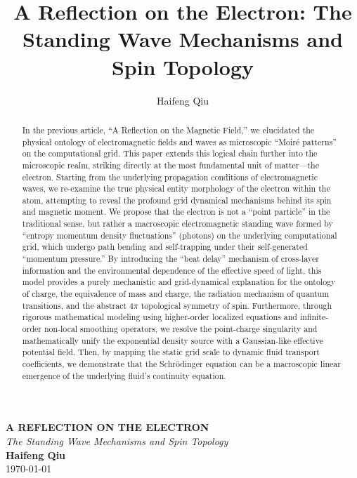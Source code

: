 \documentclass[12pt, a4paper]{article}
\title{A Reflection on the Electron: The Standing Wave Mechanisms and Spin Topology}
\author{Haifeng Qiu}
\begin{document}
\begin{center}
    {\uppercase{\Large \textbf{A Reflection on the Electron}}} \\
    \vspace{0.5em}
    {\large \textit{The Standing Wave Mechanisms and Spin Topology}} \\
    \vspace{2em}
    \textbf{Haifeng Qiu} \\
    \today
    \vspace{2em}
\end{center}

\begin{abstract}
In the previous article, ``A Reflection on the Magnetic Field,'' we elucidated the physical ontology of electromagnetic fields and waves as microscopic ``Moiré patterns'' on the computational grid. This paper extends this logical chain further into the microscopic realm, striking directly at the most fundamental unit of matter---the electron. Starting from the underlying propagation conditions of electromagnetic waves, we re-examine the true physical entity morphology of the electron within the atom, attempting to reveal the profound grid dynamical mechanisms behind its spin and magnetic moment. We propose that the electron is not a ``point particle'' in the traditional sense, but rather a macroscopic electromagnetic standing wave formed by ``entropy momentum density fluctuations'' (photons) on the underlying computational grid, which undergo path bending and self-trapping under their self-generated ``momentum pressure.'' By introducing the ``beat delay'' mechanism of cross-layer information and the environmental dependence of the effective speed of light, this model provides a purely mechanistic and grid-dynamical explanation for the ontology of charge, the equivalence of mass and charge, the radiation mechanism of quantum transitions, and the abstract $4\pi$ topological symmetry of spin.
Furthermore, through rigorous mathematical modeling using higher-order localized equations and infinite-order non-local smoothing operators, we resolve the point-charge singularity and mathematically unify the exponential density source with a Gaussian-like effective potential field. Then, by mapping the static grid scale to dynamic fluid transport coefficients, we demonstrate that the Schrödinger equation can be a macroscopic linear emergence of the underlying fluid's continuity equation.
\end{abstract}

\vspace{2em}
\end{document}
